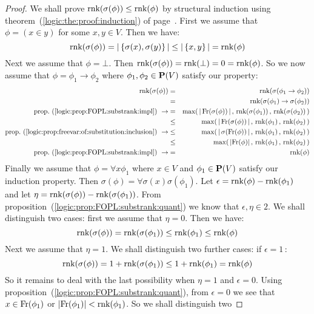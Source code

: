 \begin{proof}
We shall prove $\mbox{\rm rnk}(\sigma(\phi))\leq\mbox{\rm rnk}(\phi)$ by structural
induction using theorem~(\ref{logic:the:proof:induction}) of
page~\pageref{logic:the:proof:induction}. First we assume that
$\phi=(x\in y)$ for some $x,y\in V$. Then we have:
    \[
    \mbox{\rm rnk}(\sigma(\phi))=|\,\{\sigma(x),\sigma(y)\}\,|\leq|\,\{x,y\}\,|=\mbox{\rm rnk}(\phi)
    \]
Next we assume that $\phi=\bot$. Then
$\mbox{\rm rnk}(\sigma(\phi))=\mbox{\rm rnk}(\bot)=0=\mbox{\rm rnk}(\phi)$. So we now assume that
$\phi=\phi_{1}\to\phi_{2}$ where $\phi_{1},\phi_{2}\in\mbox{${\bf P}(V)$}$ satisfy
our property:
    \begin{eqnarray*}
    \rnk(\sigma(\phi))&=&\rnk(\sigma(\phi_{1}\to\phi_{2}))\\
    &=&\rnk(\sigma(\phi_{1})\to\sigma(\phi_{2}))\\
    \mbox{prop.~(\ref{logic:prop:FOPL:substrank:impl})}\ \rightarrow
    &=&\max(\,|\,\free(\sigma(\phi))\,|\,,\,
    \rnk(\sigma(\phi_{1}))\,,\,\rnk(\sigma(\phi_{2}))\,)\\
    &\leq&\max(\,|\,\free(\sigma(\phi))\,|\,,\,
    \rnk(\phi_{1})\,,\,\rnk(\phi_{2})\,)\\
    \mbox{prop.~(\ref{logic:prop:freevar:of:substitution:inclusion})}\ \rightarrow
    &\leq&\max(\,|\,\sigma(\free(\phi))\,|\,,\,
    \rnk(\phi_{1})\,,\,\rnk(\phi_{2})\,)\\
    &\leq&\max(\,|\free(\phi)|\,,\,
    \rnk(\phi_{1})\,,\,\rnk(\phi_{2})\,)\\
    \mbox{prop.~(\ref{logic:prop:FOPL:substrank:impl})}\ \rightarrow
    &=&\rnk(\phi)
    \end{eqnarray*}
Finally we assume that $\phi=\forall x\phi_{1}$ where $x\in V$ and
$\phi_{1}\in\mbox{${\bf P}(V)$}$ satisfy our induction property. Then
$\sigma(\phi)=\forall\sigma(x)\sigma(\phi_{1})$. Let $\epsilon
=\mbox{\rm rnk}(\phi)-\mbox{\rm rnk}(\phi_{1})$ and let
$\eta=\mbox{\rm rnk}(\sigma(\phi))-\mbox{\rm rnk}(\sigma(\phi_{1}))$. From
proposition~(\ref{logic:prop:FOPL:substrank:quant}) we know that
$\epsilon,\eta\in 2$. We shall distinguish two cases: first we
assume that $\eta=0$. Then we have:
    \[
    \mbox{\rm rnk}(\sigma(\phi))=\mbox{\rm rnk}(\sigma(\phi_{1}))\leq\mbox{\rm rnk}(\phi_{1})\leq\mbox{\rm rnk}(\phi)
    \]
Next we assume that $\eta=1$. We shall distinguish two further
cases: if $\epsilon=1$\,:
    \[
    \mbox{\rm rnk}(\sigma(\phi))=1+\mbox{\rm rnk}(\sigma(\phi_{1}))\leq1+\mbox{\rm rnk}(\phi_{1})=\mbox{\rm rnk}(\phi)
    \]
So it remains to deal with the last possibility when $\eta=1$ and
$\epsilon=0$. Using
proposition~(\ref{logic:prop:FOPL:substrank:quant}), from
$\epsilon=0$ we see that $x\in\mbox{\rm Fr}(\phi_{1})$ or
$|\mbox{\rm Fr}(\phi_{1})|<\mbox{\rm rnk}(\phi_{1})$. So we shall distinguish two

\end{proof}
